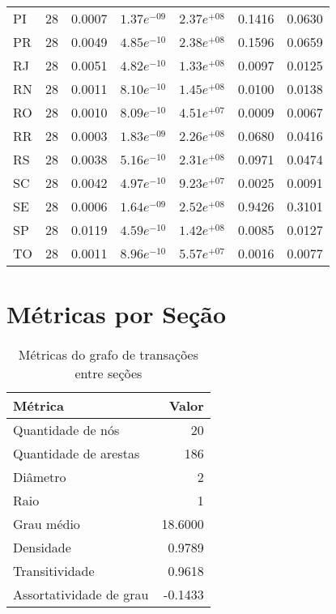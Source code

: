\begin{table}[htb]
\begin{tabular}{l|rrrrrr}
    PI   &  28 &  0.0007 &  $1.37e^{-09}$ &  $2.37e^{+08}$ &  0.1416 &  0.0630 \\
    PR   &  28 &  0.0049 &  $4.85e^{-10}$ &  $2.38e^{+08}$ &  0.1596 &  0.0659 \\
    RJ   &  28 &  0.0051 &  $4.82e^{-10}$ &  $1.33e^{+08}$ &  0.0097 &  0.0125 \\
    RN   &  28 &  0.0011 &  $8.10e^{-10}$ &  $1.45e^{+08}$ &  0.0100 &  0.0138 \\
    RO   &  28 &  0.0010 &  $8.09e^{-10}$ &  $4.51e^{+07}$ &  0.0009 &  0.0067 \\
    RR   &  28 &  0.0003 &  $1.83e^{-09}$ &  $2.26e^{+08}$ &  0.0680 &  0.0416 \\
    RS   &  28 &  0.0038 &  $5.16e^{-10}$ &  $2.31e^{+08}$ &  0.0971 &  0.0474 \\
    SC   &  28 &  0.0042 &  $4.97e^{-10}$ &  $9.23e^{+07}$ &  0.0025 &  0.0091 \\
    SE   &  28 &  0.0006 &  $1.64e^{-09}$ &  $2.52e^{+08}$ &  0.9426 &  0.3101 \\
    SP   &  28 &  0.0119 &  $4.59e^{-10}$ &  $1.42e^{+08}$ &  0.0085 &  0.0127 \\
    TO   &  28 &  0.0011 &  $8.96e^{-10}$ &  $5.57e^{+07}$ &  0.0016 &  0.0077 \\
    \bottomrule
    \end{tabular}
\fdadospesquisa
\end{table}


\section{Métricas por Seção}

\begin{table}[htb]
\centering
\caption{Métricas do grafo de transações entre seções}
\label{tab:metricas-redes:grafo-por-secao}
    \begin{tabular}{l|r}
    \toprule
    Métrica &  Valor \\
    \midrule
    Quantidade de nós       &   20      \\
    Quantidade de arestas   &  186      \\
    Diâmetro                &    2      \\
    Raio                    &    1      \\
    Grau médio              &   18.6000 \\
    Densidade               &    0.9789 \\
    Transitividade          &    0.9618 \\
    Assortatividade de grau &   -0.1433 \\
    \bottomrule
    \end{tabular}
\fdadospesquisa
\end{table}

